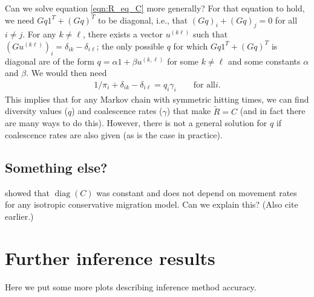 \documentclass{article}
\newcommand{\comdist}{\widetilde{R}}
\DeclareMathOperator{\diag}{\mathop{\mbox{diag}}}
\begin{document}
Can we solve equation \eqref{eqn:R_eq_C} more generally?
For that equation to hold, we need $Gq 1^T +  (Gq)^T$ to be diagonal,
i.e., that $(Gq)_i + (Gq)_j = 0$ for all $i \neq j$.
For any $k \neq \ell$, there exists a vector $u^{(k\ell)}$ such that $(Gu^{(k\ell)})_i = \delta_{ik} - \delta_{i\ell}$;
the only possible $q$ for which $Gq 1^T +  (Gq)^T$ is diagonal
are of the form $q = \alpha 1 + \beta u^{(k,\ell)}$ for some $k \neq \ell$ and some constants $\alpha$ and $\beta$.
We would then need
\begin{align}
    1/\pi_i + \delta_{ik} - \delta_{i\ell} = q_i \gamma_i \qquad \text{for all} i.
\end{align}
This implies that for any Markov chain with symmetric hitting times,
we can find diversity values ($q$) and coalescence rates ($\gamma$) that make $\comdist = C$
(and in fact there are many ways to do this).
However, there is not a general solution for $q$ if coalescence rates are also given (as is the case in practice).

\subsection*{Something else?}

\citet{strobeck1987average} showed that $\diag(C)$ was constant and does not depend on movement rates
for any isotropic conservative migration model.
Can we explain this?
(Also cite earlier.)


\section{Further inference results}

Here we put some more plots describing inference method accuracy.
\end{document}
